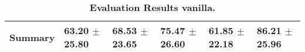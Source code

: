 \begin{table}[htb]
{\begin{tabular}{llllll}
\midrule
\textbf{Summary                                  } &                  \phantom{0}63.20 $\pm$ 25.80 &                      \phantom{0}68.53 $\pm$ 23.65 &                  \phantom{0}75.47 $\pm$ 26.60 &                  \phantom{0}61.85 $\pm$ 22.18 &            \phantom{0}86.21 $\pm$ 25.96 \\
\bottomrule
\end{tabular}%
}
\caption{\textbf{Evaluation Results vanilla.}}
\label{tab:eval-results}
\end{table}



